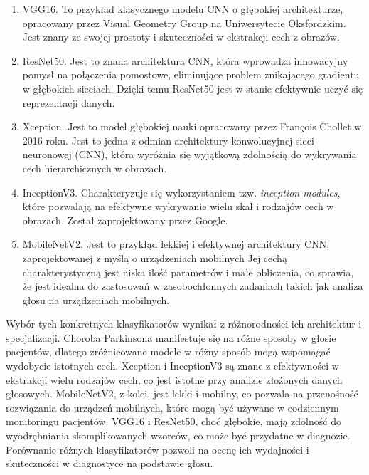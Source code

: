 \begin{enumerate}[label={\alph*)}]
    \item VGG16. To przykład klasycznego modelu CNN o głębokiej architekturze, opracowany przez Visual Geometry Group na Uniwersytecie Oksfordzkim.
    Jest znany ze swojej prostoty i skuteczności w ekstrakcji cech z obrazów.

    \item ResNet50. Jest to znana architektura CNN, która wprowadza innowacyjny pomysł na połączenia pomostowe, eliminujące problem znikającego gradientu w głębokich sieciach.
    Dzięki temu ResNet50 jest w stanie efektywnie uczyć się reprezentacji danych.

    \item Xception. Jest to model głębokiej nauki opracowany przez François Chollet w 2016 roku.
    Jest to jedna z odmian architektury konwolucyjnej sieci neuronowej (CNN), która wyróżnia się wyjątkową zdolnością do wykrywania cech hierarchicznych w obrazach.

    \item InceptionV3. Charakteryzuje się wykorzystaniem tzw. \emph{inception modules}, które pozwalają na efektywne wykrywanie wielu skal i rodzajów cech w obrazach.
    Został zaprojektowany przez Google.

    \item MobileNetV2. Jest to przykłąd lekkiej i efektywnej architektury CNN, zaprojektowanej z myślą o urządzeniach mobilnych
    Jej cechą charakterystyczną jest niska ilość parametrów i małe obliczenia, co sprawia, że jest idealna do zastosowań w zasobochłonnych zadaniach takich jak analiza głosu na urządzeniach mobilnych.

\end{enumerate}

Wybór tych konkretnych klasyfikatorów wynikał z różnorodności ich architektur i specjalizacji.
Choroba Parkinsona manifestuje się na różne sposoby w głosie pacjentów, dlatego zróżnicowane modele w różny sposób mogą wspomagać wydobycie istotnych cech.
Xception i InceptionV3 są znane z efektywności w ekstrakcji wielu rodzajów cech, co jest istotne przy analizie złożonych danych głosowych.
MobileNetV2, z kolei, jest lekki i mobilny, co pozwala na przenośność rozwiązania do urządzeń mobilnych, które mogą być używane w codziennym monitoringu pacjentów.
VGG16 i ResNet50, choć głębokie, mają zdolność do wyodrębniania skomplikowanych wzorców, co może być przydatne w diagnozie.
Porównanie różnych klasyfikatorów pozwoli na ocenę ich wydajności i skuteczności w diagnostyce na podstawie głosu.

